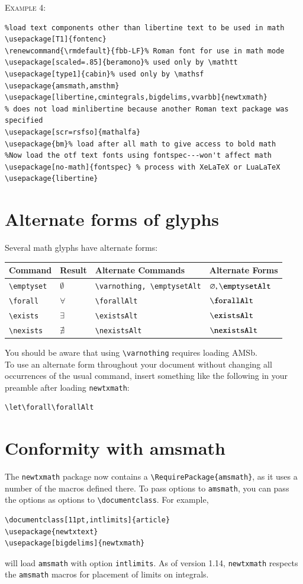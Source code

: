 \documentclass[11pt]{article}
\theoremstyle{oldplain}
\theoremstyle{plain}
\begin{document}
\textsc{Example 4:}
\begin{verbatim}
%load text components other than libertine text to be used in math
\usepackage[T1]{fontenc}
\renewcommand{\rmdefault}{fbb-LF}% Roman font for use in math mode
\usepackage[scaled=.85]{beramono}% used only by \mathtt
\usepackage[type1]{cabin}% used only by \mathsf
\usepackage{amsmath,amsthm}
\usepackage[libertine,cmintegrals,bigdelims,vvarbb]{newtxmath}
% does not load minlibertine because another Roman text package was specified
\usepackage[scr=rsfso]{mathalfa}
\usepackage{bm}% load after all math to give access to bold math
%Now load the otf text fonts using fontspec---won't affect math
\usepackage[no-math]{fontspec} % process with XeLaTeX or LuaLaTeX
\usepackage{libertine}
\end{verbatim}


\section{Alternate forms of glyphs}
Several math glyphs have alternate forms:
\begin{center}
  \begin{tabular}{@{} llll @{}}
    \hline
    Command & Result &  Alternate Commands & Alternate Forms\\ 
    \hline
    \verb|\emptyset| & $\emptyset$ & \verb|\varnothing, \emptysetAlt|& $\varnothing, \emptysetAlt$ \\ 
    \verb|\forall| & $\forall$ & \verb|\forallAlt| & $\forallAlt$ \\ 
    \verb|\exists| & $\exists$ & \verb|\existsAlt| & $\existsAlt$ \\ 
    \verb|\nexists| & $\nexists$ & \verb|\nexistsAlt| & $\nexistsAlt$ \\ 
    \hline
  \end{tabular}
\end{center}
You should be aware that using \verb|\varnothing| requires loading AMSb.\\
To use an alternate form throughout your document without changing all occurrences of the usual command, insert something like the following in your preamble after loading \texttt{newtxmath}:
\begin{verbatim}
\let\forall\forallAlt
\end{verbatim}
\section{Conformity with amsmath}
The {\tt newtxmath} package now contains a \verb|\RequirePackage{amsmath}|, as it uses a number of the macros defined there. To pass options to {\tt amsmath}, you can pass the options as options to \verb|\documentclass|. For example,
\begin{verbatim}
\documentclass[11pt,intlimits]{article}
\usepackage{newtxtext}
\usepackage[bigdelims]{newtxmath}
\end{verbatim}
will load {\tt amsmath} with option {\tt intlimits}. As of version 1.14, {\tt newtxmath} respects the {\tt amsmath} macros for placement of limits on integrals.
\end{document}
